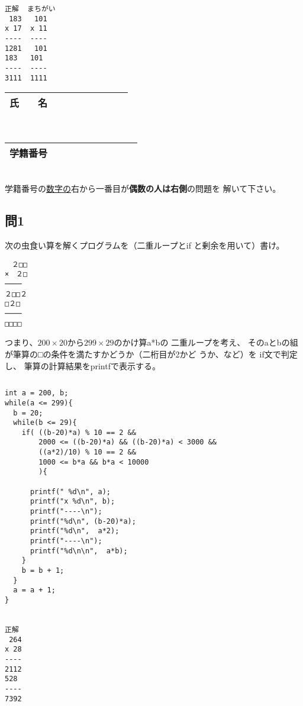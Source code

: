 \documentclass[a4j]{jarticle}
\begin{document}
\begin{multicols*}{2}
\begin{verbatim}
正解  まちがい
 183   101
x 17  x 11
----  ----
1281   101
183   101
----  ----
3111  1111
\end{verbatim}
\vspace{3cm}
\mbox{}
\fi








\noindent
\begin{tabular}[t]{|c|cccccccc|}\hline
氏　　名 & & & & & & & & \\ \hline
\end{tabular}\\
\begin{tabular}[t]{|c|c|c|c|c|c|c|c|c|c|}\hline
学籍番号 & & & & & & & & \\ \hline
\end{tabular}\\
学籍番号の\underline{数字の}右から一番目が{\bfseries 偶数の人は右側}の問題を
解いて下さい。
\vspace{-5ex}









\subsection*{問1}

次の虫食い算を解くプログラムを（二重ループと{\ttfamily if}
と剰余を用いて）書け。
\begin{verbatim}
　２□□
×　２□
────
２□□２
□２□
────
□□□□
\end{verbatim}
つまり、$200\times20$から$299\times29$のかけ算{\ttfamily a*b}の
二重ループを考え、
その{\ttfamily aとb}の組が筆算の{\bfseries □}の条件を満たすかどうか（二桁目が2かど
うか、など）を
{\ttfamily if}文で判定し、
筆算の計算結果を{\ttfamily printf}で表示する。


\ifnum {}
\begin{verbatim}

\end{verbatim}
\vspace{5cm}
\else
\begin{verbatim}
int a = 200, b;
while(a <= 299){
  b = 20;
  while(b <= 29){
    if( ((b-20)*a) % 10 == 2 &&
        2000 <= ((b-20)*a) && ((b-20)*a) < 3000 &&
        ((a*2)/10) % 10 == 2 &&
        1000 <= b*a && b*a < 10000
        ){

      printf(" %d\n", a);
      printf("x %d\n", b);
      printf("----\n");
      printf("%d\n", (b-20)*a);
      printf("%d\n",  a*2);
      printf("----\n");
      printf("%d\n\n",  a*b);
    }
    b = b + 1;
  }
  a = a + 1;
}


正解
 264
x 28
----
2112
528
----
7392
\end{verbatim}
\fi









\end{multicols*}
\end{document}

